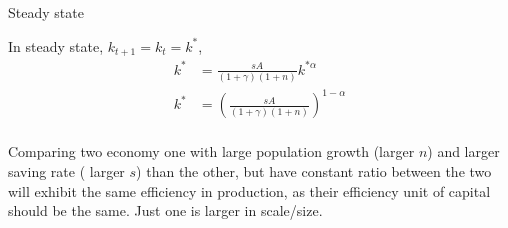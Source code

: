 \documentclass[11pt,aspectratio=169,usenames,dvipsnames]{beamer}
\let\tempone\itemize
\let\temptwo\enditemize
\renewenvironment{itemize}{\tempone\addtolength{\itemsep}{\fill}}{\temptwo}
\begin{document}
\begin{frame}{Steady state}
\label{slide:Steady_state}
    \begin{itemize}
        \item In steady state, $ k_{t+1} = k_{t} = k^{*} $,
        \[
            \begin{split}
                k^{*}
                    & = \frac{s A}{(1+\gamma)(1+n)} k^{*\alpha}
                \\
                k^{*}
                    & = \left(
                        \frac{s A}{(1+\gamma)(1+n)}
                    \right)^{1 - \alpha}
                \\
            \end{split}
        \]
        \item Comparing two economy one with large population growth (larger $ n $) and larger saving rate ( larger $ s $) than the other, but have constant ratio between the two will exhibit the same efficiency in production, as their efficiency unit of capital should be the same. Just one is larger in scale/size.
    \end{itemize}
\end{frame}
\end{document}
